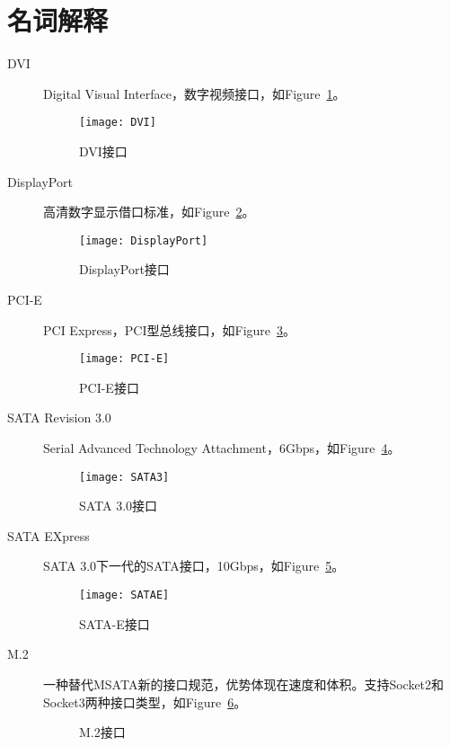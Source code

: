 \section{名词解释}
\begin{description}

\item[DVI] Digital Visual Interface，数字视频接口，如Figure~\ref{fig:dvi}。
\begin{figure}[!h]
\centering
\texttt{[image: DVI]}
\caption{DVI接口}
\label{fig:dvi}
\end{figure}

\item[DisplayPort] 高清数字显示借口标准，如Figure~\ref{fig:displayport}。
\begin{figure}[!ht]
\centering
\texttt{[image: DisplayPort]}
\caption{DisplayPort接口}
\label{fig:displayport}
\end{figure}

\item[PCI-E] PCI Express，PCI型总线接口，如Figure~\ref{fig:pci}。
\begin{figure}[!ht]
\centering
\texttt{[image: PCI-E]}
\caption{PCI-E接口}
\label{fig:pci}
\end{figure}

\item[SATA Revision 3.0] Serial Advanced Technology Attachment，6Gbps，如Figure~\ref{fig:sata3}。
\begin{figure}[!ht]
\centering
\texttt{[image: SATA3]}
\caption{SATA 3.0接口}
\label{fig:sata3}
\end{figure}

\item[SATA EXpress] SATA 3.0下一代的SATA接口，10Gbps，如Figure~\ref{fig:satae}。
\begin{figure}[!ht]
\centering
\texttt{[image: SATAE]}
\caption{SATA-E接口}
\label{fig:satae}
\end{figure}

\item[M.2] 一种替代MSATA新的接口规范，优势体现在速度和体积。支持Socket2和Socket3两种接口类型，如Figure~\ref{fig:m2}。
\begin{figure}[!ht]
  \centering 
  \subfigure[]{ 
    \texttt{[image: M2]}} 
  \caption{M.2接口}
  \label{fig:m2}
\end{figure}


\end{description}
